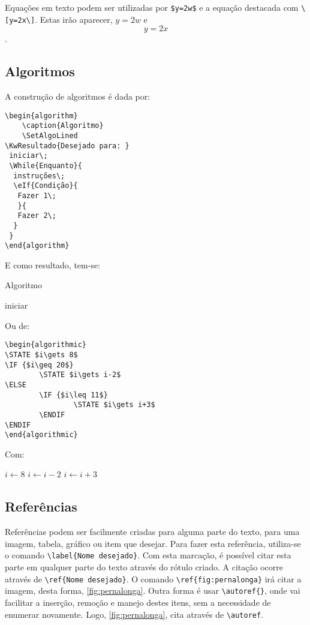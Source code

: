 Equações em texto podem ser utilizadas por \verb|$y=2w$| e a equação destacada com \verb|\[y=2x\]|. Estas irão aparecer, $y=2w$ e \[y=2x\].

\subsection{Algoritmos}
\label{algoritmos}

A construção de algoritmos é dada por:

\begin{verbatim}
\begin{algorithm}
    \caption{Algoritmo}
    \SetAlgoLined
\KwResultado{Desejado para: }
 iniciar\;
 \While{Enquanto}{
  instruções\;
  \eIf{Condição}{
   Fazer 1\;
   }{
   Fazer 2\;
  }
 }
\end{algorithm}
\end{verbatim}

E como resultado, tem-se:

\begin{algorithm}
    \caption{Algoritmo}
    \SetAlgoLined
 	iniciar\;
\end{algorithm}

Ou de:

\begin{verbatim}
\begin{algorithmic}
\STATE $i\gets 8$
\IF {$i\geq 20$} 
        \STATE $i\gets i-2$
\ELSE
        \IF {$i\leq 11$}
                \STATE $i\gets i+3$
        \ENDIF
\ENDIF 
\end{algorithmic}
\end{verbatim}


Com:

\begin{algorithmic}
\STATE $i\gets 8$
        \STATE $i\gets i-2$
\ELSE
                \STATE $i\gets i+3$
        \ENDIF
\ENDIF 
\end{algorithmic}

\subsection{Referências}
\label{referencias}
Referências podem ser facilmente criadas para alguma parte do texto, para uma imagem, tabela, gráfico ou item que desejar. Para fazer esta referência, utiliza-se o comando \verb|\label{Nome desejado}|. Com esta marcação, é possível citar esta parte em qualquer parte do texto através do rótulo criado. A citação ocorre através de \verb|\ref{Nome desejado}|. 
O comando \verb|\ref{fig:pernalonga}| irá citar a imagem, desta forma, \ref{fig:pernalonga}. Outra forma é usar \verb|\autoref{}|, onde vai facilitar a inserção, remoção e manejo destes itens, sem a necessidade de enumerar novamente. Logo, \autoref{fig:pernalonga}, cita através de \verb|\autoref|.

